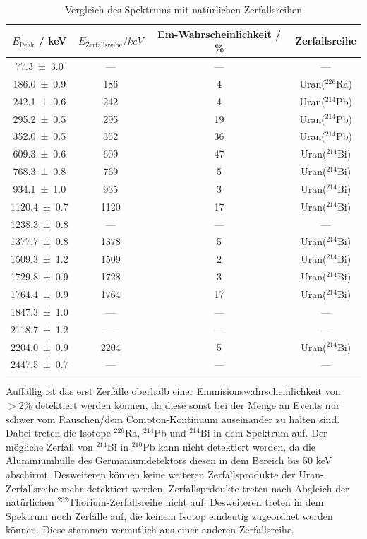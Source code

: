 \begin{table}
  \centering
  \caption{Vergleich des Spektrums mit natürlichen Zerfallsreihen}
  \begin{tabular}{c c c c}
    \toprule
    $E_\text{Peak}$ / keV & $E_\text{Zerfallsreihe} /keV$ & Em-Wahrscheinlichkeit / \% & Zerfallsreihe \\
    \midrule
    \num{77,3+-3,0}	& ---	& ---	& ---	\\
    \num{186,0+-0,9}	& 186	& 4	&Uran($^{226}$Ra)	\\
    \num{242,1+-0,6}	& 242	& 4	&Uran($^{214}$Pb)	\\
    \num{295,2+-0,5}	& 295	& 19	&Uran($^{214}$Pb)	\\
    \num{352,0+-0,5}	& 352	& 36	&Uran($^{214}$Pb)	\\
    \num{609,3+-0,6}	& 609	& 47	&Uran($^{214}$Bi)	\\
    \num{768,3+-0,8}	& 769	& 5	&Uran($^{214}$Bi)	\\
    \num{934,1+-1,0}	& 935	& 3	&Uran($^{214}$Bi)	\\
    \num{1120,4+-0,7}	& 1120	& 17	&Uran($^{214}$Bi)	\\
    \num{1238,3+-0,8}	& ---	& ---	& ---	\\
    \num{1377,7+-0,8}	& 1378	& 5	&Uran($^{214}$Bi)	\\
    \num{1509,3+-1,2}	& 1509	& 2	&Uran($^{214}$Bi)	\\
    \num{1729,8+-0,9}	& 1728	& 3	&Uran($^{214}$Bi)	\\
    \num{1764,4+-0,9}	& 1764	& 17	&Uran($^{214}$Bi)	\\
    \num{1847,3+-1,0}	& ---	& ---	& ---	\\
    \num{2118,7+-1,2}	& ---	& ---	& ---	\\
    \num{2204,0+-0,9}	& 2204	& 5  	&Uran($^{214}$Bi)	\\
    \num{2447,5+-0,7}	& ---	& ---	& ---	\\
  \end{tabular}
  \label{tab:Stone}
\end{table}
Auffällig ist das erst Zerfälle oberhalb einer Emmisionswahrscheinlichkeit von $>2\%$ detektiert werden können, da diese sonst bei der Menge an Events nur schwer vom Rauschen/dem Compton-Kontinuum auseinander zu halten sind. Dabei treten die Isotope $^{226}$Ra, $^{214}$Pb und $^{214}$Bi in dem Spektrum auf. Der mögliche Zerfall von $^{214}$Bi in $^{210}$Pb kann nicht detektiert werden, da die Aluminiumhülle des Germaniumdetektors diesen in dem Bereich bis 50 keV abschirmt. Desweiteren können keine weiteren Zerfallsprodukte der Uran-Zerfallsreihe mehr detektiert werden. Zerfallsprdoukte treten nach Abgleich der natürlichen $^{232}$Thorium-Zerfallsreihe \cite{V18} nicht auf.
Desweiteren treten in dem Spektrum noch Zerfälle auf, die keinem Isotop eindeutig zugeordnet werden können. Diese stammen vermutlich aus einer anderen Zerfallsreihe.
